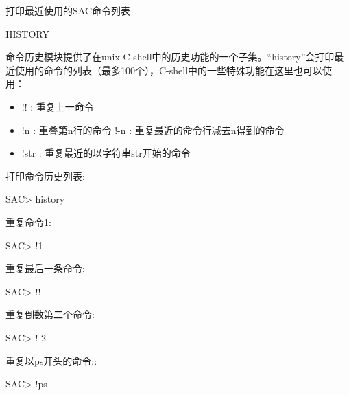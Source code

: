 \label{cmd:history}

打印最近使用的SAC命令列表

\begin{SACSTX}
HISTORY
\end{SACSTX}

命令历史模块提供了在unix C-shell中的历史功能的一个子集。``history''会打印最近使用的命令的列表（最多100个），C-shell中的一些特殊功能在这里也可以使用：
\begin{itemize}
\item !! : 重复上一命令
\item !n : 重叠第n行的命令
\iten !-n : 重复最近的命令行减去n得到的命令
\item !str : 重复最近的以字符串str开始的命令
\end{itemize}

打印命令历史列表:
\begin{SACCode}
SAC> history
\end{SACCode}

重复命令1:
\begin{SACCode}
SAC> !1
\end{SACCode}

重复最后一条命令:
\begin{SACCode}
SAC> !!
\end{SACCode}

重复倒数第二个命令:
\begin{SACCode}
SAC> !-2
\end{SACCode}

重复以ps开头的命令::
\begin{SACCode}
SAC> !ps
\end{SACCode}
